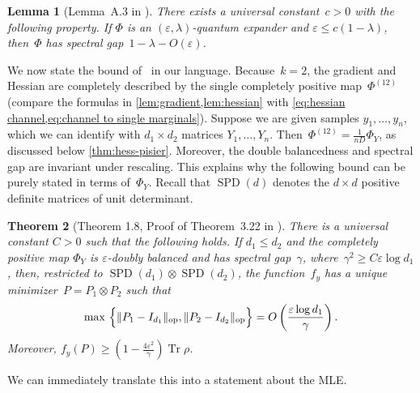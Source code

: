 \documentclass[aos]{imsart}
\newtheorem{theorem}{Theorem}[section]
\newtheorem{lemma}[theorem]{Lemma}
\theoremstyle{definition}
\numberwithin{equation}{section}
\DeclareMathOperator{\op}{op}
\DeclareMathOperator{\tr}{Tr}
\DeclareMathOperator{\SSPD}{SPD}
\DeclarePairedDelimiter{\norm}{\lVert}{\rVert}
\newcommand{\ot}{\otimes}
\newcommand{\eps}{\varepsilon}
\newcommand{\AR}[1]{{\color{orange}[AR: #1]}}
\newcommand{\AR}[1]{{}}
\begin{document}
\begin{lemma}[Lemma~A.3 in \cite{FM20}]\label{lem:fm20}
There exists a universal constant~$c>0$ with the following property.
If $\Phi$ is an $(\eps,\lambda)$-quantum expander and $\eps \leq c(1-\lambda)$, then~$\Phi$ has spectral gap~$1-\lambda-O(\eps)$.
\end{lemma}

We now state the bound of~\cite{KLR19} in our language.
Because~$k = 2$, the gradient and Hessian are completely described by the single completely positive map~$\Phi^{(12)}$ (compare the formulas in \cref{lem:gradient,lem:hessian} with \cref{eq:hessian channel,eq:channel to single marginals}).
Suppose we are given samples $y_1,\dots,y_n$, which we can identify with $d_1\times d_2$ matrices $Y_1,\dots,Y_n$.
Then~$\Phi^{(12)} = \frac1{nD}\Phi_Y$, as discussed below \cref{thm:hess-pisier}.
Moreover, the double balancedness and spectral gap are invariant under rescaling.
This explains why the following bound can be purely stated in terms of~$\Phi_Y$.
Recall that $\SSPD(d)$ denotes the $d\times d$ positive definite matrices of unit determinant.

\begin{theorem}[Theorem 1.8, Proof of Theorem~3.22 in \cite{KLR19}]\label{thm:klr}
There is a universal constant $C>0$ such that the following holds.
If $d_1 \leq d_2$ and the completely positive map $\Phi_Y$ is $\eps$-doubly balanced and has spectral gap~$\gamma$, where~$\gamma^2 \geq C \eps \log d_1$, then, restricted to $\SSPD(d_1) \ot \SSPD(d_2)$, the function~$f_y$ has a unique minimizer~$P = P_1 \ot P_2$ such that
\begin{align*}
  \max\ \Bigl\{ \norm{P_1 - I_{d_1}}_{\op}, \norm{P_2 - I_{d_2}}_{\op} \Bigr\}
= O\left(\frac{\eps \log d_1}\gamma\right).
\end{align*}
Moreover, $f_y(P) \geq (1 - \frac{4 \eps^2}{\gamma}) \tr\rho$.
\end{theorem}

We can immediately translate this into a statement about the MLE.
\end{document}

